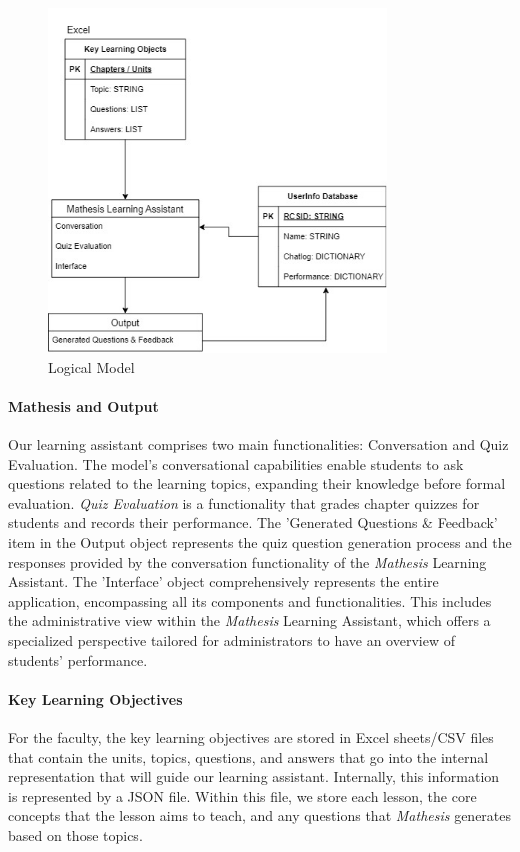 \documentclass[12pt,a4paper]{article}
\begin{document}
    \begin{figure}[H]
        \centering
        \includegraphics[width=0.8\textwidth]{images/logicalDiagram}
        \caption{Logical Model}
        \label{fig:logicalModel}
    \end{figure}

    \paragraph{Mathesis and Output}
    Our learning assistant comprises two main functionalities: Conversation and Quiz Evaluation.
    The model's conversational capabilities enable students to ask questions related to the learning
    topics, expanding their knowledge before formal evaluation. \textit{Quiz Evaluation} is a functionality
    that grades chapter quizzes for students and records their performance. The 'Generated Questions
    \& Feedback' item in the Output object represents the quiz question generation process and the
    responses provided by the conversation functionality of the \textit{Mathesis} Learning Assistant. The
    'Interface' object comprehensively represents the entire application, encompassing all its
    components and functionalities.  This includes the administrative view within the \textit{Mathesis}
    Learning Assistant, which offers a specialized perspective tailored for administrators to have
    an overview of students' performance.

    \paragraph{Key Learning Objectives}
    For the faculty, the key learning
    objectives are stored in Excel sheets/CSV files that contain the units, topics, questions, and answers that
    go into the internal representation that will guide our learning assistant.  Internally, this
    information is represented by a JSON file.  Within this file, we store each lesson, the core
    concepts that the lesson aims to teach, and any questions that \textit{Mathesis} generates based
    on those topics.
\end{document}
